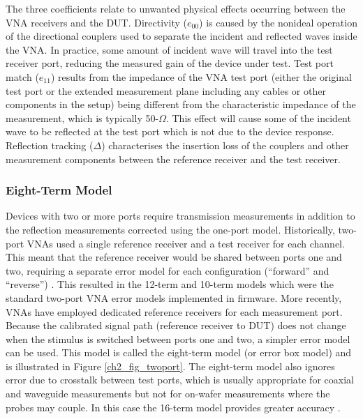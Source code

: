 \documentclass[../thesis/thesis.tex]{subfiles}
\begin{document}
\begin{refsection}
The three coefficients relate to unwanted physical effects occurring between the VNA receivers and the DUT. Directivity ($e_{00}$) is caused by the nonideal operation of the directional couplers used to separate the incident and reflected waves inside the VNA. In practice, some amount of incident wave will travel into the test receiver port, reducing the measured gain of the device under test.
Test port match ($e_{11}$) results from the impedance of the VNA test port (either the original test port or the extended measurement plane including any cables or other components in the setup) being different from the characteristic impedance of the measurement, which is typically 50-$\Omega$. This effect will cause some of the incident wave to be reflected at the test port which is not due to the device response.
Reflection tracking ($\Delta$) characterises the insertion loss of the couplers and other measurement components between the reference receiver and the test receiver.

\subsubsection{Eight-Term Model}

Devices with two or more ports require transmission measurements in addition to the reflection measurements corrected using the one-port model. Historically, two-port VNAs used a single reference receiver and a test receiver for each channel. This meant that the reference receiver would be shared between ports one and two, requiring a separate error model for each configuration (``forward'' and ``reverse'') \cite{Rehnmark_1974}. This resulted in the 12-term and 10-term models which were the standard two-port VNA error models implemented in firmware. More recently, VNAs have employed dedicated reference receivers for each measurement port. Because the calibrated signal path (reference receiver to DUT) does not change when the stimulus is switched between ports one and two, a simpler error model can be used. This model is called the eight-term model (or error box model) and is illustrated in Figure \ref{ch2_fig_twoport}. The eight-term model also ignores error due to crosstalk between test ports, which is usually appropriate for coaxial and waveguide measurements but not for on-wafer measurements where the probes may couple. In this case the 16-term model provides greater accuracy \cite{Butler_1991}.


\end{refsection}
\end{document}
